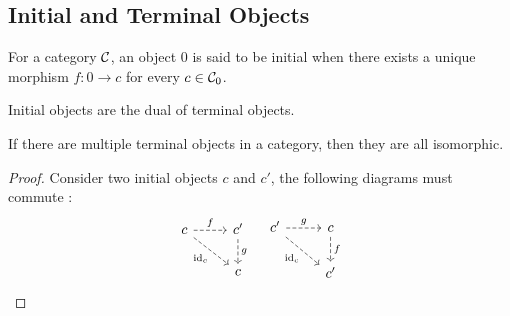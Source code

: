 \subsection{Initial and Terminal Objects}

\begin{definition}
  For a category $\mathcal{C}$, an object $0$ is said to be initial when there exists a
  unique morphism $f: 0\to c$ for every $c\in \mathcal{C}_0$.
  \parencite{awodey:category_theory}
\end{definition}

\begin{remark}
  Initial objects are the dual of terminal objects.
\end{remark}

\begin{theorem}
  If there are multiple terminal objects in a category, then they are all
  isomorphic.

  \begin{proof}
    Consider two initial objects $c$ and $c'$, the following diagrams must
    commute :
    \[\begin{tikzcd}
      c & {c'} \\
      & c
      \arrow["{\id_c}"', dashed, from=1-1, to=2-2]
      \arrow["f", dashed, from=1-1, to=1-2]
      \arrow["g", dashed, from=1-2, to=2-2]
    \end{tikzcd}
    \quad
    \begin{tikzcd}
      {c'} & c \\
      & {c'}
      \arrow["{\id_c}"', dashed, from=1-1, to=2-2]
      \arrow["g", dashed, from=1-1, to=1-2]
      \arrow["f", dashed, from=1-2, to=2-2]
    \end{tikzcd}\]
  \end{proof}
\end{theorem}

